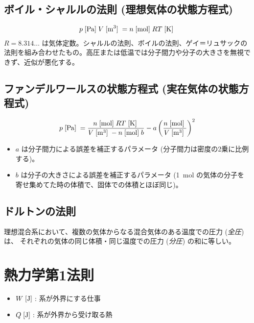 \documentclass[a4paper,11pt]{jsarticle}
\newcommand{\braunit}[1]{\;\text{[}\unit[per-mode = symbol]{#1}\text{]}\;}
\begin{document}
\subsection{ボイル・シャルルの法則 (理想気体の状態方程式)}
\begin{align*}
  p\braunit{\Pa}V\braunit{\m^3} = n\braunit{\mol}RT\braunit{\K}
\end{align*}
$R=8.314\dots$ は気体定数。シャルルの法則、ボイルの法則、ゲイ＝リュサックの法則を組み合わせたもの。高圧または低温では分子間力や分子の大きさを無視できず、近似が悪化する。
\cite[pp.15]{thermo}

\subsection{ファンデルワールスの状態方程式 (実在気体の状態方程式)}
\begin{align*}
  p\braunit{\Pa} = \frac{n\braunit{\mol}RT\braunit{\K}}{V\braunit{\m^3} - n\braunit{\mol}b} - a\left(\frac{n\braunit{\mol}}{V\braunit{\m^3}}\right)^2
\end{align*}
\begin{itemize}
  \item $a$ は分子間力による誤差を補正するパラメータ (分子間力は密度の2乗に比例する)。
  \item $b$ は分子の大きさによる誤差を補正するパラメータ (\qty{1}{\mol} の気体の分子を寄せ集めてた時の体積で、固体での体積とほぼ同じ)。
\end{itemize}
\cite[pp.17]{thermo}

\subsection{ドルトンの法則}
理想混合系において、複数の気体からなる混合気体のある温度での圧力 (\emph{全圧}) は、
それぞれの気体の同じ体積・同じ温度での圧力 (\emph{分圧}) の和に等しい。
\cite[pp.18]{thermo}

\section{熱力学第1法則}

\begin{itemize}
  \item $W\braunit{\J}$: 系が外界にする仕事
  \item $Q\braunit{\J}$: 系が外界から受け取る熱
\end{itemize}
\end{document}
